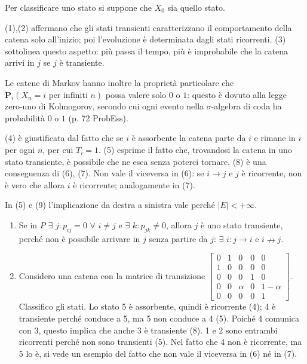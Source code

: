 \documentclass{article}
\begin{document}
Per classificare uno stato si suppone che $X_{0}$ sia quello stato.

(1),(2) affermano che gli stati transienti caratterizzano il comportamento
della catena solo all'inizio; poi l'evoluzione \`{e} determinata dagli stati
ricorrenti. (3) sottolinea questo aspetto: pi\`{u} passa il tempo, pi\`{u} 
\`{e} improbabile che la catena arrivi in $j$ se $j$ \`{e} transiente.

Le catene di Markov hanno inoltre la propriet\`{a} particolare che $\mathbf{P%
}_{i}\left( X_{n}=i\text{ per infiniti }n\right) $ possa valere solo $0$ o $%
1 $: questo \`{e} dovuto alla legge zero-uno di Kolmogorov, secondo cui ogni
evento nella $\sigma $-algebra di coda ha probabilit\`{a} $0$ o $1$ (p. 72
ProbEss).

(4) \`{e} giustificata dal fatto che se $i$ \`{e} assorbente la catena parte
da $i$ e rimane in $i$ per ogni $n$, per cui $T_{i}=1$. (5) esprime il fatto
che, trovandosi la catena in uno stato transiente, \`{e} possibile che ne
esca senza poterci tornare. (8) \`{e} una conseguenza di (6), (7). Non vale
il viceversa in (6): se $i\rightarrow j$ e $j$ \`{e} ricorrente, non \`{e}
vero che allora $i$ \`{e} ricorrente; analogamente in (7).

In (5) e (9) l'implicazione da destra a sinistra vale perch\'{e} $\left\vert
E\right\vert <+\infty $.

\begin{enumerate}
\item Se in $P$ $\exists $ $j:p_{ij}=0$ $\forall $ $i\neq j$ e $\exists $ $%
k:p_{jk}\neq 0$, allora $j$ \`{e} uno stato transiente, perch\'{e} non \`{e}
possibile arrivare in $j$ senza partire da $j$: $\exists $ $i:j\rightarrow i$
e $i\nrightarrow j$.

\item Considero una catena con la matrice di transizione $\left[ 
\begin{array}{ccccc}
0 & 1 & 0 & 0 & 0 \\ 
1 & 0 & 0 & 0 & 0 \\ 
0 & 0 & 0 & 1 & 0 \\ 
0 & 0 & \alpha & 0 & 1-\alpha \\ 
0 & 0 & 0 & 0 & 1%
\end{array}%
\right] $. Classifico gli stati. Lo stato 5 \`{e} assorbente, quindi \`{e}
ricorrente (4); 4 \`{e} transiente perch\'{e} conduce a 5, ma 5 non conduce
a 4 (5). Poich\'{e} 4 comunica con 3, questo implica che anche 3 \`{e}
transiente (8). 1 e 2 sono entrambi ricorrenti perch\'{e} non sono
transienti (5). Nel fatto che 4 non \`{e} ricorrente, ma 5 lo \`{e}, si vede
un esempio del fatto che non vale il viceversa in (6) n\'{e} in (7).
\end{enumerate}
\end{document}
